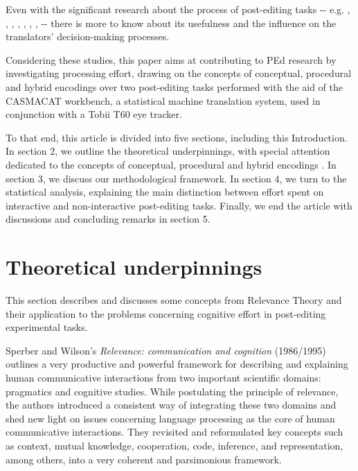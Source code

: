 \documentclass[output=paper]{langsci/langscibook}
\begin{document}
Even with the significant research about the process of post-editing tasks -{}- e.g. \citet{Guerberof2012}, \citet{obrien2006}, \citet{obrien2009}, \citet{Depraetere2010}, \citet{Plitt2010}, \citet{Sousa2011}, \citet{specia2009}, \citet{specia2011} -{}- there is more to know about its usefulness and the influence on the translators’ decision-making processes. 



Considering these studies, this paper aims at contributing to PEd research by investigating processing effort, drawing on the concepts of conceptual, procedural and hybrid encodings over two post-editing tasks performed with the aid of the CASMACAT workbench, a statistical machine translation system, used in conjunction with a Tobii T60 eye tracker.



To that end, this article is divided into five sections, including this Introduction. In section 2, we outline the theoretical underpinnings, with special attention dedicated to the concepts of conceptual, procedural and hybrid encodings \citep{moeschler1998, Wilson2011, alves2013}. In section 3, we discuss our methodological framework. In section 4, we turn to the statistical analysis, explaining the main distinction between effort spent on interactive and non-interactive post-editing tasks. Finally, we end the article with discussions and concluding remarks in section 5.


\section{Theoretical underpinnings}

This section describes and discusses some concepts from Relevance Theory \citep{Sperber1986second} and their application to the problems concerning cognitive effort in post-editing experimental tasks. 


Sperber and Wilson’s \textit{Relevance: communication and cognition} (1986/1995) outlines a very productive and powerful framework for describing and explaining human communicative interactions from two important scientific domains: pragmatics and cognitive studies. While postulating the principle of relevance, the authors introduced a consistent way of integrating these two domains and shed new light on issues concerning language processing as the core of human communicative interactions. They revisited and reformulated key concepts such as context, mutual knowledge, cooperation, code, inference, and representation, among others, into a very coherent and parsimonious framework.
\end{document}
